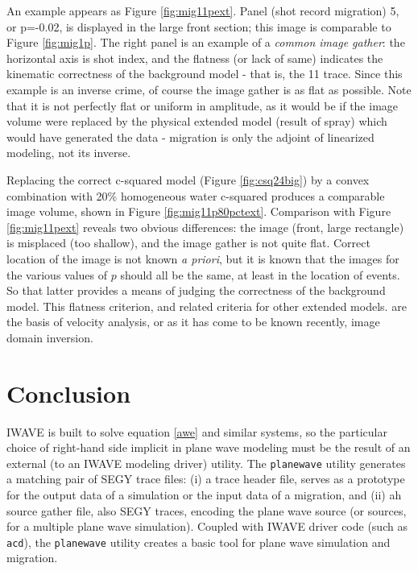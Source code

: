 An example appears as Figure \ref{fig:mig11pext}. Panel (shot record migration) 5, or p=-0.02, is displayed in the large front section; this image is comparable to Figure \ref{fig:mig1p}. The right panel is an example of a {\em common image gather}: the horizontal axis is shot index, and the flatness (or lack of same) indicates the kinematic correctness of the background model - that is, the 11 trace. Since this example is an inverse crime, of course the image gather is as flat as possible. Note that it is not perfectly flat or uniform in amplitude, as it would be if the image volume were replaced by the physical extended model (result of spray) which would have generated the data - migration is only the adjoint of linearized modeling, not its inverse. 


Replacing the correct c-squared model (Figure \ref{fig:csq24big}) by a convex combination with 20\% homogeneous water c-squared produces a comparable image volume, shown in Figure \ref{fig:mig11p80pctext}. Comparison with Figure \ref{fig:mig11pext} reveals two obvious differences: the image (front, large rectangle) is misplaced (too shallow), and the image gather is not quite flat. Correct location of the image is not known {\em a priori}, but it is known that the images for the various values of $p$ should all be the same, at least in the location of events. So that latter provides a means of judging the correctness of the background model. This flatness criterion, and related criteria for other extended models. are the basis of velocity analysis, or as it has come to be known recently, image domain inversion.


\section{Conclusion}

IWAVE is built to solve equation \ref{awe} and similar systems, so the particular choice of right-hand side implicit in plane wave modeling must be the result of an external (to an IWAVE modeling driver) utility. The {\tt planewave} utility generates a matching pair of SEGY trace files: (i) a trace header file, serves as a prototype for the output data of a simulation or the input data of a migration, and (ii) ah source gather file, also SEGY traces, encoding the plane wave source (or sources, for a multiple plane wave simulation). Coupled with IWAVE driver code (such as {\tt acd}), the {\tt planewave} utility creates a basic tool for plane wave simulation and migration.

